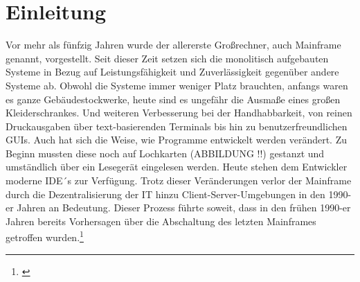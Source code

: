 \chapter{Einleitung}\label{ch:einleitung}
Vor mehr als fünfzig Jahren wurde der allererste Großrechner, auch Mainframe genannt, vorgestellt.
Seit dieser Zeit setzen sich die monolitisch aufgebauten Systeme in Bezug auf Leistungsfähigkeit und Zuverlässigkeit gegenüber andere Systeme ab.
Obwohl die Systeme immer weniger Platz brauchten, anfangs waren es ganze Gebäudestockwerke, heute sind es ungefähr die Ausmaße eines großen Kleiderschrankes.
Und weiteren Verbesserung bei der Handhabbarkeit, von reinen Druckausgaben über text-basierenden Terminals bis hin zu benutzerfreundlichen GUIs.
Auch hat sich die Weise, wie Programme entwickelt werden verändert.
Zu Beginn mussten diese noch auf Lochkarten (ABBILDUNG !!) gestanzt und umständlich über ein Lesegerät eingelesen werden.
Heute stehen dem Entwickler moderne IDE´s zur Verfügung.
Trotz dieser Veränderungen verlor der Mainframe durch die Dezentralisierung der IT hinzu Client-Server-Umgebungen in den 1990-er Jahren an Bedeutung.
Dieser Prozess führte soweit, dass in den frühen 1990-er Jahren bereits Vorhersagen über die Abschaltung des letzten Mainframes getroffen wurden.\footnote{\cite{Alsop.1993}}
\cite{Ceruzzi.2003}

